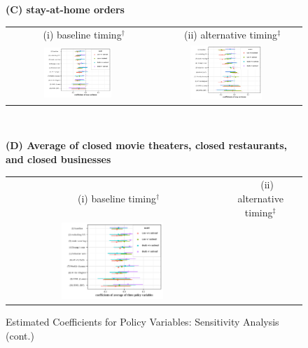 \documentclass[11pt,reqno,letter]{amsart}
\theoremstyle{definition}
\begin{document}
   \addtocounter{figure}{-1}
\begin{figure}[ht]
  \caption{Estimated Coefficients for Policy Variables:  Sensitivity Analysis (cont.) \label{fig:whisker-2}}\bigskip
  \begin{minipage}{\linewidth}
    \centering
   {\textbf{(C)  stay-at-home orders}}\\
    \medskip
    \begin{tabular}{cc}
 $\quad$  (i) baseline timing$^\dagger$ &$\quad$ (ii) alternative timing$^\ddagger$\\
      \includegraphics[width=0.5\textwidth]{tables_and_figures/pshelter-whisker-14}
      &
      \includegraphics[width=0.5\textwidth]{tables_and_figures/pshelter-whisker-7}
    \end{tabular}
  \end{minipage} \\ \smallskip
    \begin{minipage}{\linewidth}
    \centering
     {\textbf{(D)  Average of  closed movie theaters, closed restaurants, and closed  businesses}}\\
    \medskip
    \begin{tabular}{cc}
 $\quad$  (i) baseline timing$^\dagger$ &$\quad$ (ii) alternative timing$^\ddagger$\\
      \includegraphics[width=0.5\textwidth]{tables_and_figures/pindex-whisker-14}

\end{tabular}
\end{minipage}
\end{figure}
\end{document}
